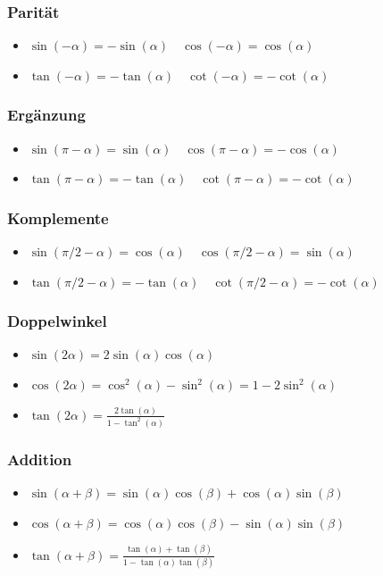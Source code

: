 \documentclass[a4paper,fontsize = 7pt]{scrartcl}
\begin{document}
\subsubsection{Parität}
\begin{itemize}
 \item $\sin(-\alpha) = - \sin(\alpha) \quad \cos(-\alpha) = \cos(\alpha)$
 \item $\tan(-\alpha) = - \tan(\alpha) \quad \cot(-\alpha) = - \cot(\alpha)$
\end{itemize}

\subsubsection{Ergänzung}
\begin{itemize}
 \item $\sin(\pi - \alpha) = \sin(\alpha) \quad \cos(\pi - \alpha) = - \cos(\alpha)$
 \item $\tan(\pi - \alpha) = -\tan(\alpha) \quad \cot(\pi - \alpha) = - \cot(\alpha)$
\end{itemize}


\subsubsection{Komplemente}
\begin{itemize}
 \item $\sin(\pi/2 - \alpha) = \cos(\alpha) \quad \cos(\pi/2 - \alpha) = \sin(\alpha)$
 \item $\tan(\pi/2 - \alpha) = -\tan(\alpha) \quad \cot(\pi/2 - \alpha) = -\cot(\alpha)$
\end{itemize}

\subsubsection{Doppelwinkel}
\begin{itemize}
 \item $\sin(2\alpha) = 2 \sin(\alpha) \cos(\alpha)$
 \item $\cos(2\alpha) = \cos^2(\alpha) - \sin^2(\alpha) = 1 - 2 \sin^2(\alpha)$
 \item $\tan(2\alpha) = \frac{2\tan(\alpha)}{1 - \tan^2(\alpha)}$
\end{itemize}

\subsubsection{Addition}
\begin{itemize}
 \item $\sin(\alpha + \beta) = \sin(\alpha) \cos(\beta) + \cos(\alpha) \sin(\beta)$
 \item $\cos(\alpha + \beta) = \cos(\alpha) \cos(\beta) - \sin(\alpha) \sin(\beta)$
 \item $\tan(\alpha + \beta) = \frac{\tan(\alpha) + \tan(\beta)}{1 - \tan(\alpha) \tan(\beta)}$
\end{itemize}
\end{document}
